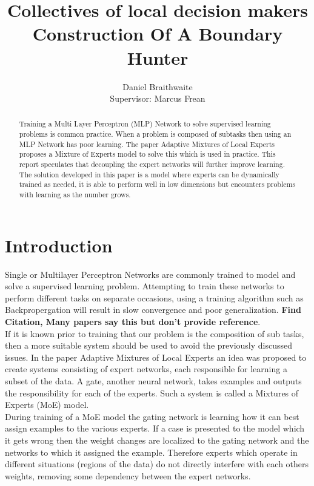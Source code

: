 \documentclass[notitlepage]{report}
\title{%
	Collectives of local decision makers\\
	\large Construction Of A Boundary Hunter
}
\author{Daniel Braithwaite\\[1cm] {Supervisor: Marcus Frean}}
\theoremstyle{definition}
\begin{document}
\begin{titlingpage}
    \maketitle
    \begin{abstract}
    	Training a Multi Layer Perceptron (MLP) Network to solve supervised learning problems is common practice. When a problem is composed of subtasks then using an MLP Network has poor learning. The paper Adaptive Mixtures of Local Experts \cite{jacobs1991adaptive} proposes a Mixture of Experts model to solve this which is used in practice. This report speculates that decoupling the expert networks will further improve learning. The solution developed in this paper is a model where experts can be dynamically trained as needed, it is able to perform well in low dimensions but encounters problems with learning as the number grows.
    \end{abstract}
\end{titlingpage}

\chapter{Introduction}

Single or Multilayer Perceptron Networks are commonly trained to model and solve a supervised learning problem. Attempting to train these networks to perform different tasks on separate occasions, using a training algorithm such as Backpropergation will result in slow convergence and poor generalization. \textbf{Find Citation, Many papers say this but don't provide reference}.\\

If it is known prior to training that our problem is the composition of sub tasks, then a more suitable system should be used to avoid the previously discussed issues. In the paper Adaptive Mixtures of Local Experts \cite{jacobs1991adaptive} an idea was proposed to create systems consisting of expert networks, each responsible for learning a subset of the data. A gate, another neural network, takes examples and outputs the responsibility for each of the experts. Such a system is called a Mixtures of Experts (MoE) model.\\

During training of a MoE model the gating network is learning how it can best assign examples to the various experts. If a case is presented to the model which it gets wrong then the weight changes are localized to the gating network and the networks to which it assigned the example. Therefore experts which operate in different situations (regions of the data) do not directly interfere with each others weights, removing some dependency between the expert networks.\\
\end{document}
